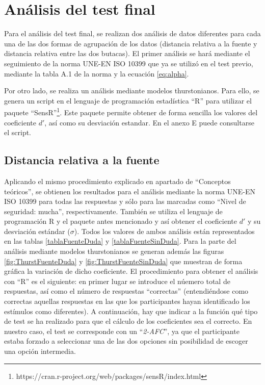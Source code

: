 \documentclass[11pt,a4paper,twoside]{book}
\begin{document}
    \section{Análisis del test final}
        Para el análisis del test final, se realizan dos análisis de datos diferentes para cada una de las dos formas de agrupación de los datos (distancia relativa a la fuente y distancia relativa entre las dos  butacas). El primer análisis se hará mediante el seguimiento de la norma UNE-EN ISO 10399 que ya se utilizó en el test previo, mediante la tabla A.1 de la norma y la ecuación \ref{eq:alpha}.
        
        Por otro lado, se realiza un análisis mediante modelos thurstonianos. Para ello, se genera un script en el lenguaje de programación estadística ``R'' para utilizar el paquete ``SensR''\footnote{https://cran.r-project.org/web/packages/sensR/index.html}. Este paquete permite obtener de forma sencilla los valores del coeficiente $d'$, así como su desviación estandar. En el anexo E puede consultarse el script.
        
        
		\subsection{Distancia relativa a la fuente}
		    Aplicando el mismo procedimiento explicado en apartado de ``Conceptos teóricos'', se obtienen los resultados para el análisis mediante la norma UNE-EN ISO 10399 para todas las respuestas y sólo para las marcadas como ``Nivel de seguridad: mucha'', respectivamente. También se utiliza el lenguaje de programación R y el paquete antes mencionado y así obtener el coeficiente $d'$ y su desviación estándar ($\sigma$). Todos los valores de ambos análisis están representados en las tablas \ref{tablaFuenteDuda} y \ref{tablaFuenteSinDuda}. Para la parte del análisis mediante modelos thurstonianos se generan además las figuras \ref{fig:ThurstFuenteDuda} y \ref{fig:ThurstFuenteSinDuda} que muestran de forma gráfica la variación de dicho coeficiente. El procedimiento para obtener el análisis con ``R'' es el siguiente: en primer lugar se introduce el núemero total de respuestas, así como el número de respuestas ``correctas'' (entendiéndose como correctas aquellas respuestas en las que los participantes hayan identificado los estímulos como diferentes). A continuación, hay que indicar a la función qué tipo de test se ha realizado para que el cálculo de los coeficientes sea el correcto. En nuestro caso, el test se corresponde con un ``\textit{2-AFC}'', ya que el participante estaba forzado a seleccionar una de las dos opciones sin posibilidad de escoger una opción intermedia.
		    
\end{document}
